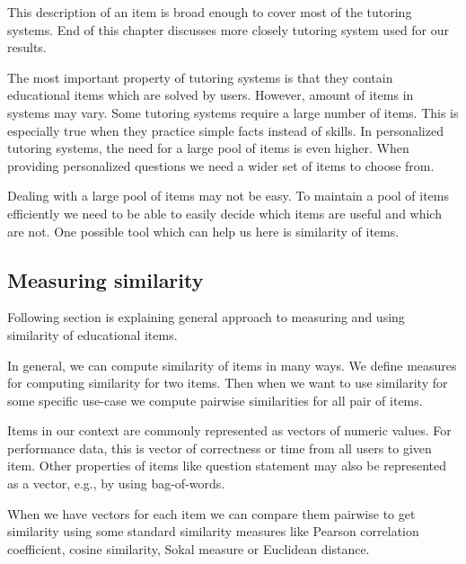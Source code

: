 \documentclass[
  digital, %
  table,   %
  nolof,     %
  nolot,     %
  nocover
]{fithesis3}
\begin{document}
This description of an item is broad enough to cover most of the tutoring systems. End of this chapter discusses more closely tutoring system used for our results.


The most important property of tutoring systems is that they contain educational items which are solved by users. However, amount of items in systems may vary. Some tutoring systems require a large number of items. This is especially true when they practice simple facts instead of skills. In personalized tutoring systems, the need for a large pool of items is even higher. When providing personalized questions we need a wider set of items to choose from.


Dealing with a large pool of items may not be easy. To maintain a pool of items efficiently we need to be able to easily decide which items are useful and which are not. One possible tool which can help us here is similarity of items.

\subsection{Measuring similarity}\label{measuring-similarity}

Following section is explaining general approach to measuring and using similarity of educational items.


In general, we can compute similarity of items in many ways. We define measures for computing similarity for two items. Then when we want to use similarity for some specific use-case we compute pairwise similarities for all pair of items.

Items in our context are commonly represented as vectors of numeric values. For performance data, this is vector of correctness or time from all users to given item. Other properties of items like question statement may also be represented as a vector, e.g., by using bag-of-words.

When we have vectors for each item we can compare them pairwise to get similarity using some standard similarity measures like Pearson correlation coefficient, cosine similarity, Sokal measure or Euclidean distance.

\end{document}
